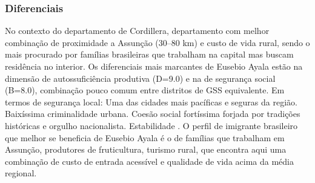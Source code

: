 \subsubsection*{Diferenciais}\label{dif-eusebio-ayala-0307}
No contexto do departamento de Cordillera, departamento com melhor combinação de proximidade a Assunção (30–80 km) e custo de vida rural, sendo o mais procurado por famílias brasileiras que trabalham na capital mas buscam residência no interior. Os diferenciais mais marcantes de Eusebio Ayala estão na dimensão de autossuficiência produtiva (D=9.0) e na de segurança social (B=8.0), combinação pouco comum entre distritos de GSS equivalente. Em termos de segurança local: Uma das cidades mais pacíficas e seguras da região. Baixíssima criminalidade urbana. Coesão social fortíssima forjada por tradições históricas e orgulho nacionalista. Estabilidade . O perfil de imigrante brasileiro que melhor se beneficia de Eusebio Ayala é o de famílias que trabalham em Assunção, produtores de fruticultura, turismo rural, que encontra aqui uma combinação de custo de entrada acessível e qualidade de vida acima da média regional.
